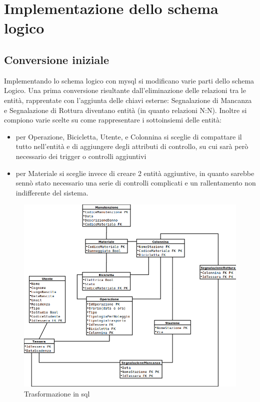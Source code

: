 \documentclass[a4paper,twoside]{article}
\begin{document}
\section{Implementazione dello schema logico}
\subsection{Conversione iniziale}
Implementando lo schema logico con mysql si modificano varie parti dello schema Logico.\newline
Una prima conversione risultante dall'eliminazione delle relazioni tra le entità, rapprentate con l'aggiunta delle chiavi esterne: Segnalazione di Mancanza e Segnalazione di Rottura diventano entità (in quanto relazioni N:N).\newline
Inoltre si compiono varie scelte su come rappresentare i sottoinsiemi delle entità:
\begin{itemize}
 \item per Operazione, Bicicletta, Utente, e Colonnina si sceglie di compattare il tutto nell'entità e di aggiungere degli attributi di controllo, su cui sarà però necessario dei trigger o controlli aggiuntivi
 \item per Materiale si sceglie invece di creare 2 entità aggiuntive, in quanto sarebbe sennò stato necessario una serie di controlli complicati e un rallentamento non indifferente del sistema.
\end{itemize}
\begin{figure}[H]
 \centering
  \includegraphics[width=1\textwidth]{Immagini-Grafici/SQL.png}
\caption{Trasformazione in sql}
\end{figure}
\end{document}
